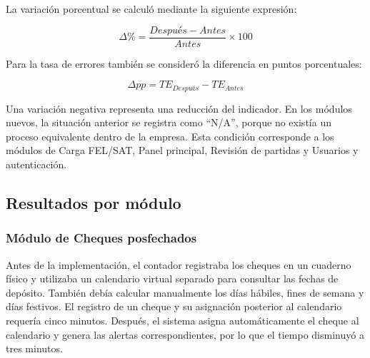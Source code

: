La variación porcentual se calculó mediante la siguiente expresión:

\begin{equation}
\Delta\% = \frac{Después - Antes}{Antes}\times 100
\end{equation}

Para la tasa de errores también se consideró la diferencia en puntos porcentuales:

\begin{equation}
\Delta pp = TE_{Después} - TE_{Antes}
\end{equation}

Una variación negativa representa una reducción del indicador. En los módulos nuevos, la situación anterior se registra como ``N/A'', porque no existía un proceso equivalente dentro de la empresa. Esta condición corresponde a los módulos de Carga FEL/SAT, Panel principal, Revisión de partidas y Usuarios y autenticación.

\subsection{Resultados por módulo}

\subsubsection{Módulo de Cheques posfechados}

Antes de la implementación, el contador registraba los cheques en un cuaderno físico y utilizaba un calendario virtual separado para consultar las fechas de depósito. También debía calcular manualmente los días hábiles, fines de semana y días festivos. El registro de un cheque y su asignación posterior al calendario requería cinco minutos. Después, el sistema asigna automáticamente el cheque al calendario y genera las alertas correspondientes, por lo que el tiempo disminuyó a tres minutos.

